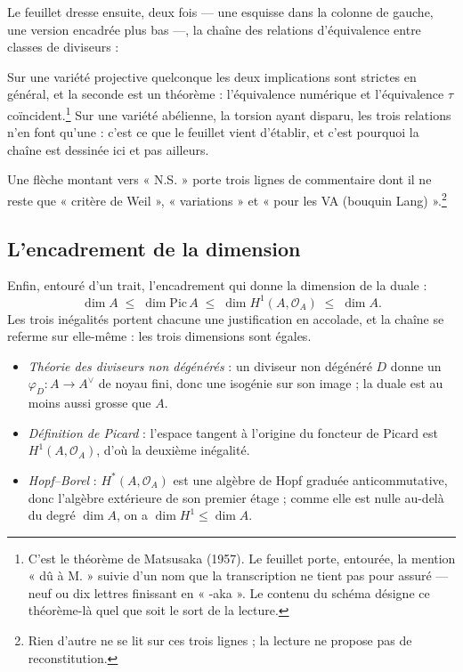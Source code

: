 \documentclass[11pt,a4paper]{article}
\begin{document}
Le feuillet dresse ensuite, deux fois — une esquisse dans la colonne de gauche,
une version encadrée plus bas —, la chaîne des relations d'équivalence entre
classes de diviseurs :


Sur une variété projective quelconque les deux implications sont strictes en
général, et la seconde est un théorème : l'équivalence numérique et
l'équivalence $\tau$ coïncident.\footnote{C'est le théorème de Matsusaka
(1957). Le feuillet porte, entourée, la mention « dû à M. » suivie d'un nom
que la transcription ne tient pas pour assuré — neuf ou dix lettres finissant
en « -aka ». Le contenu du schéma désigne ce théorème-là quel que
soit le sort de la lecture.} Sur une variété abélienne, la torsion ayant
disparu, les trois relations n'en font qu'une : c'est ce que le feuillet vient
d'établir, et c'est pourquoi la chaîne est dessinée ici et pas ailleurs.

Une flèche montant vers « N.S. » porte trois lignes de commentaire dont il ne
reste que « critère de Weil », « variations » et « pour les VA (bouquin
Lang) ».\footnote{Rien d'autre ne se lit sur ces trois lignes ; la lecture ne
propose pas de reconstitution.}

\subsection*{L'encadrement de la dimension}

Enfin, entouré d'un trait, l'encadrement qui donne la dimension de la duale :
\[
  \dim A \;\leq\; \dim \mathrm{Pic}\,A \;\leq\;
  \dim H^{1}(A, \mathcal{O}_{A}) \;\leq\; \dim A .
\]
Les trois inégalités portent chacune une justification en accolade, et la
chaîne se referme sur elle-même : les trois dimensions sont égales.

\begin{itemize}
\item \emph{Théorie des diviseurs non dégénérés} : un diviseur non dégénéré $D$
  donne un $\varphi_{D} : A \to A^{\vee}$ de noyau fini, donc une isogénie sur
  son image ; la duale est au moins aussi grosse que $A$.
\item \emph{Définition de Picard} : l'espace tangent à l'origine du foncteur de
  Picard est $H^{1}(A, \mathcal{O}_{A})$, d'où la deuxième inégalité.
\item \emph{Hopf--Borel} : $H^{*}(A, \mathcal{O}_{A})$ est une algèbre de Hopf
  graduée anticommutative, donc l'algèbre extérieure de son premier étage ;
  comme elle est nulle au-delà du degré $\dim A$, on a
  $\dim H^{1} \leq \dim A$.
\end{itemize}
\end{document}
